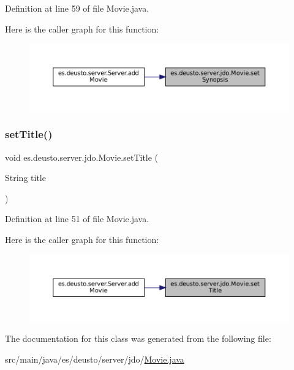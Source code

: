 Definition at line 59 of file Movie.\+java.

Here is the caller graph for this function\+:
\nopagebreak
\begin{figure}[H]
\begin{center}
\leavevmode
\includegraphics[width=350pt]{classes_1_1deusto_1_1server_1_1jdo_1_1_movie_a8bc588baca5c14a900a83d8a0326542c_icgraph}
\end{center}
\end{figure}
\mbox{\label{classes_1_1deusto_1_1server_1_1jdo_1_1_movie_ae5ef76349074d7d94803152daacc9e54}} 
\subsubsection{\texorpdfstring{setTitle()}{setTitle()}}
{\footnotesize\ttfamily void es.\+deusto.\+server.\+jdo.\+Movie.\+set\+Title (\begin{DoxyParamCaption}\item[{String}]{title }\end{DoxyParamCaption})}



Definition at line 51 of file Movie.\+java.

Here is the caller graph for this function\+:
\nopagebreak
\begin{figure}[H]
\begin{center}
\leavevmode
\includegraphics[width=350pt]{classes_1_1deusto_1_1server_1_1jdo_1_1_movie_ae5ef76349074d7d94803152daacc9e54_icgraph}
\end{center}
\end{figure}


The documentation for this class was generated from the following file\+:\begin{DoxyCompactItemize}
\item 
src/main/java/es/deusto/server/jdo/\mbox{\hyperlink{_movie_8java}{Movie.\+java}}\end{DoxyCompactItemize}
